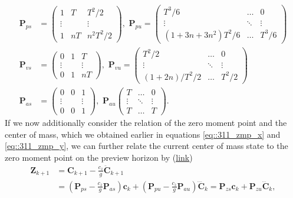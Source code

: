 \begin{align}
	\bm{P}_{ps} &= \begin{pmatrix}
	1 & T & T^2/2 \\
	\vdots & & \vdots \\
	1 & nT & n^2T^2/2
	\end{pmatrix},\,\,
	\bm{P}_{pu} = \begin{pmatrix}
	T^3/6 & \dots & 0 \\
	\vdots & \ddots & \vdots \\
	(1+3n+3n^2)T^2/6 & \dots & T^3/6
	\end{pmatrix} \\
	\bm{P}_{vs} &= \begin{pmatrix}
	0 & 1 & T \\
	\vdots & & \vdots \\
	0 & 1 & nT
	\end{pmatrix},\,\,
	\bm{P}_{vu} = \begin{pmatrix}
	T^2/2 & \dots & 0 \\
	\vdots & \ddots & \vdots \\
	(1+2n)/T^2/2 & \dots & T^2/2
	\end{pmatrix} \\
	\bm{P}_{as} &= \begin{pmatrix}
	0 & 0 & 1 \\
	\vdots  &  & \vdots \\
	 0 & 0 & 1
	\end{pmatrix},\,\,
	\bm{P}_{au}\begin{pmatrix}
	T & \dots & 0 \\
	\vdots & \ddots & \vdots \\
	T & \dots & T
	\end{pmatrix}.
\end{align}
If we now additionally consider the relation of the zero moment point and the center of mass, which we obtained earlier in equations \ref{eq::311_zmp_x} and \ref{eq::311_zmp_y}, we can further relate the current center of mass state to the zero moment point on the preview horizon by (\href{https://github.com/mhubii/nmpc_pattern_generator/blob/5a213044c927dc6aac9f7e32ce1e5fb472cd67bb/libs/pattern_generator/include/pattern_generator/base_generator.h#L219}{\underline{link}})
\begin{align}
	\bm{Z}_{k+1} &= \bm{C}_{k+1} - \frac{c_z}{g}\ddot{\bm{C}}_{k+1} \\
	&= \left(\bm{P}_{ps}-\frac{c_z}{g}\bm{P}_{as}\right)\bm{c}_k + \left(\bm{P}_{pu}-\frac{c_z}{g}\bm{P}_{au}\right)\ddddot{\bm{C}}_k = \bm{P}_{zs} \bm{c}_k + \bm{P}_{zu}\dddot{\bm{C}}_k,
	\label{eq::312_zmp}
\end{align}
